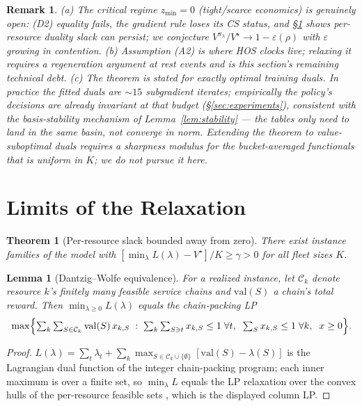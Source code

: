 \documentclass[11pt]{article}
\newtheorem{theorem}{Theorem}
\newtheorem{lemma}{Lemma}
\newtheorem{remark}{Remark}
\newcommand{\Vstar}{V^{\star}}
\newcommand{\pol}{\pi_{\lambda}}
\begin{document}
\begin{remark}
(a) The critical regime $z_{\min} = 0$ (tight/scarce economics) is
genuinely open: (D2) equality fails, the gradient rule loses its CS
status, and \S\ref{sec:limits} shows per-resource duality slack can
persist; we conjecture $V^{\pol}/\Vstar \to 1 - \varepsilon(\rho)$ with
$\varepsilon$ growing in contention. (b) Assumption (A2) is where HOS
clocks live; relaxing it requires a regeneration argument at rest events
and is this section's remaining technical debt. (c) The theorem is
stated for exactly optimal training duals. In practice the fitted
duals are ${\sim}15$ subgradient iterates; empirically the policy's
decisions are already invariant at that budget
(\S\ref{sec:experiments}), consistent with the basis-stability
mechanism of Lemma~\ref{lem:stability} --- the tables only need to
land in the same basin, not converge in norm. Extending the theorem to
value-suboptimal duals requires a sharpness modulus for the
bucket-averaged functionals that is uniform in $K$; we do not pursue
it here.
\end{remark}

\section{Limits of the Relaxation}
\label{sec:limits}

\begin{theorem}[Per-resource slack bounded away from zero]
\label{thm:kernel}
There exist instance families of the model with
$[\min_{\lambda} L(\lambda) - \Vstar] / K \geq \gamma > 0$ for all fleet
sizes $K$.
\end{theorem}

\begin{lemma}[Dantzig--Wolfe equivalence]
\label{lem:dw}
For a realized instance, let $\mathcal{C}_k$ denote resource $k$'s
finitely many feasible service chains and $\mathrm{val}(S)$ a chain's
total reward. Then $\min_{\lambda \geq 0} L(\lambda)$ equals the
chain-packing LP
\begin{equation}
  \max \Bigl\{ \textstyle\sum_k \sum_{S \in \mathcal{C}_k}
  \mathrm{val}(S)\, x_{k,S} \;:\;
  \sum_k \sum_{S \ni t} x_{k,S} \leq 1 \;\forall t,\;\;
  \sum_S x_{k,S} \leq 1 \;\forall k,\;\; x \geq 0 \Bigr\}.
  \label{eq:chainlp}
\end{equation}
\end{lemma}

\begin{proof}
$L(\lambda) = \sum_t \lambda_t + \sum_k \max_{S \in \mathcal{C}_k \cup
\{\emptyset\}} [\mathrm{val}(S) - \lambda(S)]$ is the Lagrangian dual
function of the integer chain-packing program; each inner maximum is
over a finite set, so $\min_{\lambda} L$ equals the LP relaxation over
the convex hulls of the per-resource feasible sets
\citep[Dantzig--Wolfe;][]{geoffrion1974lagrangean}, which is the
displayed column LP.
\end{proof}
\end{document}
